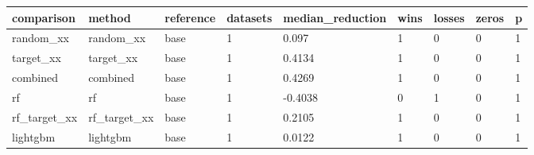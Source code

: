 \begin{tabular}{lllllllll}
\toprule
comparison & method & reference & datasets & median\_reduction & wins & losses & zeros & p \\
\midrule
random\_xx & random\_xx & base & 1 & 0.097 & 1 & 0 & 0 & 1 \\
target\_xx & target\_xx & base & 1 & 0.4134 & 1 & 0 & 0 & 1 \\
combined & combined & base & 1 & 0.4269 & 1 & 0 & 0 & 1 \\
rf & rf & base & 1 & -0.4038 & 0 & 1 & 0 & 1 \\
rf\_target\_xx & rf\_target\_xx & base & 1 & 0.2105 & 1 & 0 & 0 & 1 \\
lightgbm & lightgbm & base & 1 & 0.0122 & 1 & 0 & 0 & 1 \\
\bottomrule
\end{tabular}
